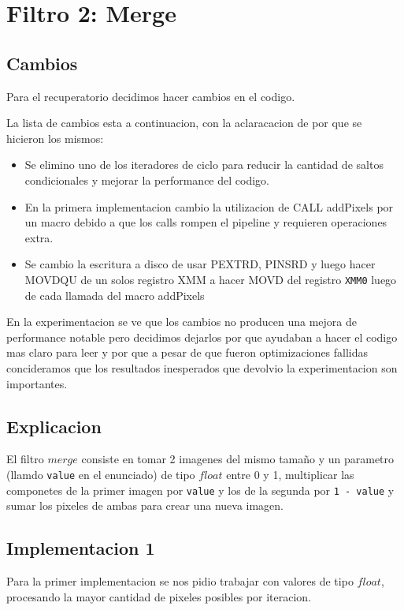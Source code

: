 \section{Filtro 2: Merge}

\subsection{Cambios}
Para el recuperatorio decidimos hacer cambios en el codigo.

La lista de cambios esta a continuacion, con la aclaracacion de por que se hicieron los mismos:
\noindent
\begin{itemize}
\item Se elimino uno de los iteradores de ciclo para reducir la cantidad de saltos condicionales y mejorar la performance del codigo.
\item En la primera implementacion cambio la utilizacion de CALL addPixels por un macro debido a que los calls rompen el pipeline y requieren operaciones extra.
\item Se cambio la escritura a disco de usar PEXTRD, PINSRD y luego hacer MOVDQU de un solos registro XMM a hacer MOVD del registro \texttt{XMM0} luego de cada llamada del macro addPixels
\end{itemize}

En la experimentacion se ve que los cambios no producen una mejora de performance notable pero decidimos dejarlos por que ayudaban a hacer el codigo mas claro para leer y por que a pesar de que fueron optimizaciones fallidas concideramos que los resultados inesperados que devolvio la experimentacion son importantes.

\subsection{Explicacion}
El filtro $merge$ consiste en tomar 2 imagenes del mismo tamaño y un parametro (llamdo \texttt{value} en el enunciado) de tipo $float$ entre 0 y 1, multiplicar las componetes de la primer imagen por \texttt{value} y los de la segunda por \texttt{1 - value} y sumar los pixeles de ambas para crear una nueva imagen. \\

\subsection{Implementacion 1}
Para la primer implementacion se nos pidio trabajar con valores de tipo $float$, procesando la mayor cantidad de pixeles posibles por iteracion. \\

